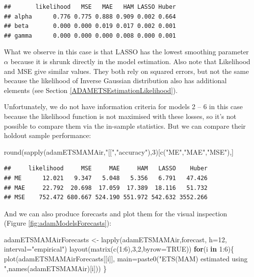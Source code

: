 \documentclass[
]{book}
\newenvironment{Shaded}{\begin{snugshade}}{\end{snugshade}}
\newcommand{\AttributeTok}[1]{\textcolor[rgb]{0.77,0.63,0.00}{#1}}
\newcommand{\ConstantTok}[1]{\textcolor[rgb]{0.00,0.00,0.00}{#1}}
\newcommand{\ControlFlowTok}[1]{\textcolor[rgb]{0.13,0.29,0.53}{\textbf{#1}}}
\newcommand{\DecValTok}[1]{\textcolor[rgb]{0.00,0.00,0.81}{#1}}
\newcommand{\FunctionTok}[1]{\textcolor[rgb]{0.00,0.00,0.00}{#1}}
\newcommand{\NormalTok}[1]{#1}
\newcommand{\OtherTok}[1]{\textcolor[rgb]{0.56,0.35,0.01}{#1}}
\newcommand{\SpecialCharTok}[1]{\textcolor[rgb]{0.00,0.00,0.00}{#1}}
\newcommand{\StringTok}[1]{\textcolor[rgb]{0.31,0.60,0.02}{#1}}
\theoremstyle{definition}
\theoremstyle{definition}
\theoremstyle{definition}
\theoremstyle{definition}
\theoremstyle{remark}
\begin{document}
\begin{verbatim}
##       likelihood   MSE   MAE   HAM LASSO Huber
## alpha      0.776 0.775 0.888 0.909 0.002 0.664
## beta       0.000 0.000 0.019 0.017 0.002 0.001
## gamma      0.000 0.000 0.000 0.008 0.000 0.001
\end{verbatim}

What we observe in this case is that LASSO has the lowest smoothing parameter \(\alpha\) because it is shrunk directly in the model estimation. Also note that Likelihood and MSE give similar values. They both rely on squared errors, but not the same because the likelihood of Inverse Gaussian distribution also has additional elements (see Section \ref{ADAMETSEstimationLikelihood}).

Unfortunately, we do not have information criteria for models 2 -- 6 in this case because the likelihood function is not maximised with these losses, so it's not possible to compare them via the in-sample statistics. But we can compare their holdout sample performance:

\begin{Shaded}
\begin{Highlighting}[]
\FunctionTok{round}\NormalTok{(}\FunctionTok{sapply}\NormalTok{(adamETSMAMAir,}\StringTok{"[["}\NormalTok{,}\StringTok{"accuracy"}\NormalTok{),}\DecValTok{3}\NormalTok{)[}\FunctionTok{c}\NormalTok{(}\StringTok{"ME"}\NormalTok{,}\StringTok{"MAE"}\NormalTok{,}\StringTok{"MSE"}\NormalTok{),]}
\end{Highlighting}
\end{Shaded}

\begin{verbatim}
##     likelihood     MSE     MAE     HAM   LASSO    Huber
## ME      12.021   9.347   5.048   5.356   6.791   47.426
## MAE     22.792  20.698  17.059  17.389  18.116   51.732
## MSE    752.472 680.667 524.190 551.972 542.632 3552.266
\end{verbatim}

And we can also produce forecasts and plot them for the visual inspection (Figure \ref{fig:adamModelsForecasts}):

\begin{Shaded}
\begin{Highlighting}[]
\NormalTok{adamETSMAMAirForecasts }\OtherTok{\textless{}{-}} \FunctionTok{lapply}\NormalTok{(adamETSMAMAir,forecast,}
                                 \AttributeTok{h=}\DecValTok{12}\NormalTok{, }\AttributeTok{interval=}\StringTok{"empirical"}\NormalTok{)}
\FunctionTok{layout}\NormalTok{(}\FunctionTok{matrix}\NormalTok{(}\FunctionTok{c}\NormalTok{(}\DecValTok{1}\SpecialCharTok{:}\DecValTok{6}\NormalTok{),}\DecValTok{3}\NormalTok{,}\DecValTok{2}\NormalTok{,}\AttributeTok{byrow=}\ConstantTok{TRUE}\NormalTok{))}
\ControlFlowTok{for}\NormalTok{(i }\ControlFlowTok{in} \DecValTok{1}\SpecialCharTok{:}\DecValTok{6}\NormalTok{)\{}
    \FunctionTok{plot}\NormalTok{(adamETSMAMAirForecasts[[i]],}
         \AttributeTok{main=}\FunctionTok{paste0}\NormalTok{(}\StringTok{"ETS(MAM) estimated using "}\NormalTok{,}\FunctionTok{names}\NormalTok{(adamETSMAMAir)[i]))}
\NormalTok{\}}
\end{Highlighting}
\end{Shaded}
\end{document}
